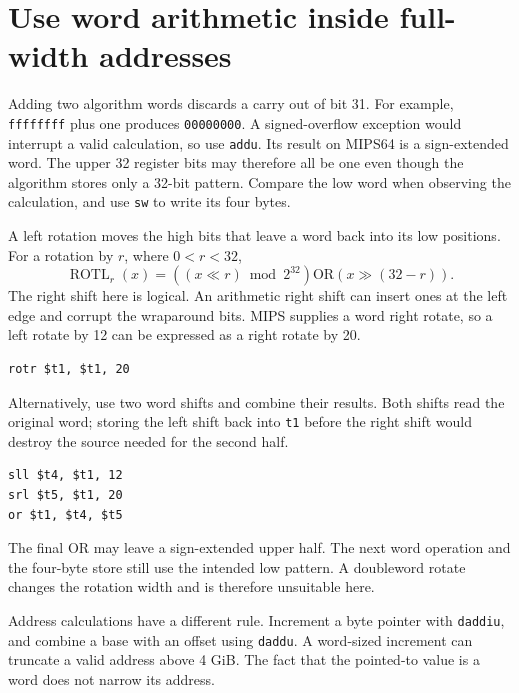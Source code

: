 \section{Use word arithmetic inside full-width addresses}
Adding two algorithm words discards a carry out of bit 31. For example,
\texttt{ffffffff} plus one produces \texttt{00000000}. A signed-overflow exception
would interrupt a valid calculation, so use \texttt{addu}. Its result on MIPS64 is a
sign-extended word. The upper 32 register bits may therefore all be one even though
the algorithm stores only a 32-bit pattern. Compare the low word when observing the
calculation, and use \texttt{sw} to write its four bytes.

A left rotation moves the high bits that leave a word back into its low positions.
For a rotation by \(r\), where \(0<r<32\),
\[
\operatorname{ROTL}_r(x)=
 ((x\ll r)\bmod2^{32})\mathbin{\mathrm{OR}}(x\gg(32-r)).
\]
The right shift here is logical. An arithmetic right shift can insert ones at the
left edge and corrupt the wraparound bits. MIPS supplies a word right rotate, so a
left rotate by 12 can be expressed as a right rotate by 20.
\begin{verbatim}
rotr $t1, $t1, 20
\end{verbatim}

Alternatively, use two word shifts and combine their results. Both shifts read the
original word; storing the left shift back into \texttt{t1} before the right shift
would destroy the source needed for the second half.
\begin{verbatim}
sll $t4, $t1, 12
srl $t5, $t1, 20
or $t1, $t4, $t5
\end{verbatim}

The final OR may leave a sign-extended upper half. The next word operation and the
four-byte store still use the intended low pattern. A doubleword rotate changes the
rotation width and is therefore unsuitable here.

Address calculations have a different rule. Increment a byte pointer with
\texttt{daddiu}, and combine a base with an offset using \texttt{daddu}. A word-sized
increment can truncate a valid address above 4 GiB. The fact that the pointed-to value
is a word does not narrow its address.
